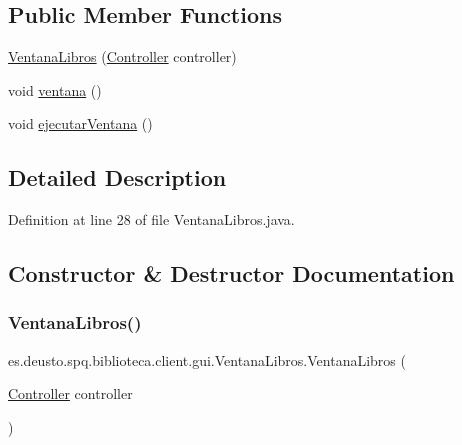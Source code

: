 \subsection*{Public Member Functions}
\begin{DoxyCompactItemize}
\item 
\mbox{\hyperlink{classes_1_1deusto_1_1spq_1_1biblioteca_1_1client_1_1gui_1_1_ventana_libros_adb57377bdb0e3082d1efddafd6aff633}{Ventana\+Libros}} (\mbox{\hyperlink{classes_1_1deusto_1_1spq_1_1biblioteca_1_1controller_1_1_controller}{Controller}} controller)
\item 
void \mbox{\hyperlink{classes_1_1deusto_1_1spq_1_1biblioteca_1_1client_1_1gui_1_1_ventana_libros_a6615018a56e392b80c49c4c49a94f55b}{ventana}} ()
\item 
void \mbox{\hyperlink{classes_1_1deusto_1_1spq_1_1biblioteca_1_1client_1_1gui_1_1_ventana_libros_af168d6a20e95444277d58e981b8a9372}{ejecutar\+Ventana}} ()
\end{DoxyCompactItemize}


\subsection{Detailed Description}


Definition at line 28 of file Ventana\+Libros.\+java.



\subsection{Constructor \& Destructor Documentation}
\mbox{\label{classes_1_1deusto_1_1spq_1_1biblioteca_1_1client_1_1gui_1_1_ventana_libros_adb57377bdb0e3082d1efddafd6aff633}} 
\subsubsection{\texorpdfstring{Ventana\+Libros()}{VentanaLibros()}}
{\footnotesize\ttfamily es.\+deusto.\+spq.\+biblioteca.\+client.\+gui.\+Ventana\+Libros.\+Ventana\+Libros (\begin{DoxyParamCaption}\item[{\mbox{\hyperlink{classes_1_1deusto_1_1spq_1_1biblioteca_1_1controller_1_1_controller}{Controller}}}]{controller }\end{DoxyParamCaption})}

